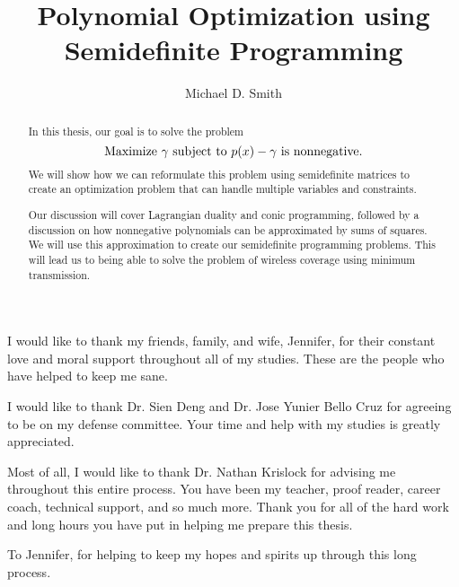 \documentclass[12pt]{niuthesis}
\begin{document}
\title{Polynomial Optimization using Semidefinite Programming}

\author{Michael D. Smith}


\begin{abstract}
  In this thesis, our goal is to solve the problem
  \begin{displaymath}
    \textnormal{Maximize } \gamma \textnormal{ subject to } p(x) - \gamma \textnormal{ is nonnegative.}
  \end{displaymath}
  We will show how we can reformulate this problem using semidefinite matrices to create an optimization problem that can handle multiple variables and constraints. 
  
  Our discussion will cover Lagrangian duality and conic programming, followed by a discussion on how nonnegative polynomials can be approximated by sums of squares. We will use this approximation to create our semidefinite programming problems. This will lead us to being able to solve the problem of wireless coverage using minimum transmission.
\end{abstract}

\begin{acknowledgments}
  I would like to thank my friends, family, and wife, Jennifer, for their constant love and moral support throughout all of my studies. These are the people who have helped to keep me sane. 
  
  I would like to thank Dr. Sien Deng and Dr. Jose Yunier Bello Cruz for agreeing to be on my defense committee. Your time and help with my studies is greatly appreciated.
  
  Most of all, I would like to thank Dr. Nathan Krislock for advising me throughout this entire process. You have been my teacher, proof reader, career coach, technical support, and so much more. Thank you for all of the hard work and long hours you have put in helping me prepare this thesis. 
\end{acknowledgments}

\begin{dedication}
  To Jennifer, for helping to keep my hopes and spirits up through this long process.
\end{dedication}

\MakeThesisPrologue %





\appendix
\end{document}
